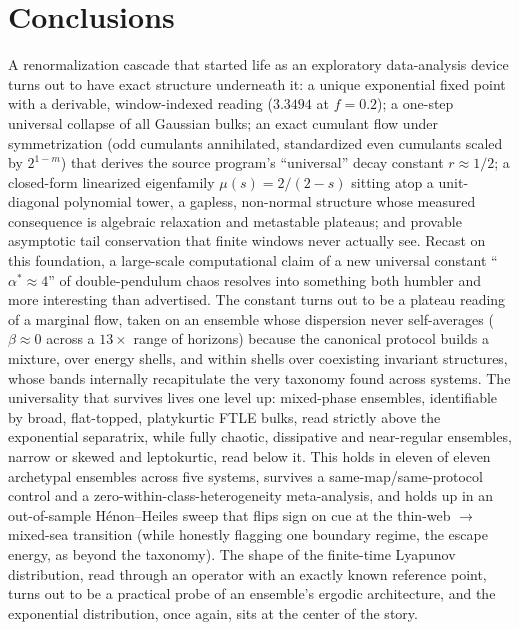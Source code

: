 \documentclass[11pt,a4paper]{article}
\theoremstyle{remark}
\begin{document}
\section{Conclusions}\label{sec:conclusions}

A renormalization cascade that started life as an exploratory data-analysis device turns out to have
exact structure underneath it: a unique exponential fixed point with a derivable, window-indexed
reading ($3.3494$ at $f = 0.2$); a one-step universal collapse of all Gaussian bulks; an exact
cumulant flow under symmetrization (odd cumulants annihilated, standardized even cumulants scaled by
$2^{1-m}$) that derives the source program's ``universal'' decay constant $r \approx 1/2$; a
closed-form linearized eigenfamily $\mu(s) = 2/(2-s)$ sitting atop a unit-diagonal polynomial tower,
a gapless, non-normal structure whose measured consequence is algebraic relaxation and metastable
plateaus; and provable asymptotic tail conservation that finite windows never actually see. Recast on
this foundation, a large-scale computational claim of a new universal constant ``$\alpha^* \approx
4$'' of double-pendulum chaos resolves into something both humbler and more interesting than
advertised. The constant turns out to be a plateau reading of a marginal flow, taken on an ensemble
whose dispersion never self-averages ($\beta \approx 0$ across a $13\times$ range of horizons)
because the canonical protocol builds a mixture, over energy shells, and within shells over
coexisting invariant structures, whose bands internally recapitulate the very taxonomy found across
systems. The universality that survives lives one level up: mixed-phase ensembles, identifiable by
broad, flat-topped, platykurtic FTLE bulks, read strictly above the exponential separatrix, while
fully chaotic, dissipative and near-regular ensembles, narrow or skewed and leptokurtic, read below
it. This holds in eleven of eleven archetypal ensembles across five systems, survives a
same-map/same-protocol control and a zero-within-class-heterogeneity meta-analysis, and holds up in
an out-of-sample H\'enon--Heiles sweep that flips sign on cue at the thin-web $\to$ mixed-sea
transition (while honestly flagging one boundary regime, the escape energy, as beyond the taxonomy).
The shape of the finite-time Lyapunov distribution, read through an operator with an exactly known
reference point, turns out to be a practical probe of an ensemble's ergodic architecture, and the
exponential distribution, once again, sits at the center of the story.
\end{document}
